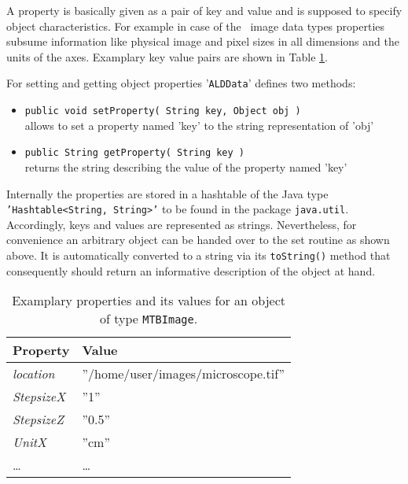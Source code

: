 A property is basically given as a pair of key and value and is supposed to specify object characteristics. For
example in case of the \mitobo\ image data types properties subsume information like physical image and pixel sizes in all
dimensions and the units of the axes. Examplary key value pairs are shown in Table \ref{tab:propImg}.

For setting and getting object properties '{\tt ALDData}' defines two methods:
\begin{itemize}
    \item {\tt public void setProperty( String key, Object obj )}\\
    	allows to set a property named 'key' to the string representation of 'obj'
    \item {\tt public String getProperty( String key )}\\
		returns the string describing the value of the property named 'key'
\end{itemize}

Internally the properties are stored in a hashtable of the Java type {\tt 'Hashtable<String, String>'} to be found in
the package {\tt java.util}. Accordingly, keys and values are represented as strings. Nevertheless,
for convenience an arbitrary object can be handed over to the set routine as
shown above. It is automatically converted to a string via its {\tt toString()} method that consequently should return an informative description of the object at hand.
\begin{center}
\begin{table}[t]
\begin{center}
\begin{tabular}{l|l}
Property & Value \\
\hline
{\em location}  & ''/home/user/images/microscope.tif'' \\
{\em StepsizeX} & ''1''  \\
{\em StepsizeZ} & ''0.5''\\
{\em UnitX}     & ''cm'' \\
\ldots & \ldots 
\end{tabular}
\caption[Example properties of {\tt MTBImage}.]
  {\label{tab:propImg}Examplary properties and its values for an object of type {\tt MTBImage}.}
\end{center}
\end{table}
\end{center}

